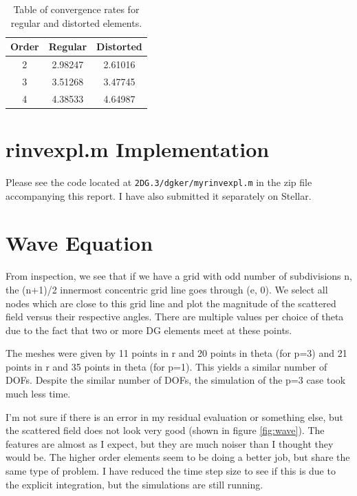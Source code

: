\documentclass{article}
\begin{document}
\begin{table}[!ht]
\centering
\caption{Table of convergence rates for regular and distorted elements.}
\label{tbl:cc}
\begin{tabular}{c c c}
Order & Regular & Distorted \\
\midrule
2 & 2.98247 & 2.61016\\
3 & 3.51268 & 3.47745 \\
4 & 4.38533 & 4.64987 \\
\end{tabular}
\end{table}

\section{rinvexpl.m Implementation}
Please see the code located at \texttt{2DG.3/dgker/myrinvexpl.m} in the zip file accompanying this report.
I have also submitted it separately on Stellar.

\section{Wave Equation}
From inspection, we see that if we have a grid with odd number of subdivisions n, the (n+1)/2 innermost concentric grid line goes through (e, 0).
We select all nodes which are close to this grid line and plot the magnitude of the scattered field versus their respective angles.
There are multiple values per choice of theta due to the fact that two or more DG elements meet at these points.

The meshes were given by 11 points in r and 20 points in theta (for p=3) and 21 points in r and 35 points in theta (for p=1).
This yields a similar number of DOFs.
Despite the similar number of DOFs, the simulation of the p=3 case took much less time.

I'm not sure if there is an error in my residual evaluation or something else, but the scattered field does not look very good (shown in figure \ref{fig:wave}).
The features are almost as I expect, but they are much noiser than I thought they would be.
The higher order elements seem to be doing a better job, but share the same type of problem.
I have reduced the time step size to see if this is due to the explicit integration, but the simulations are still running.
\end{document}
